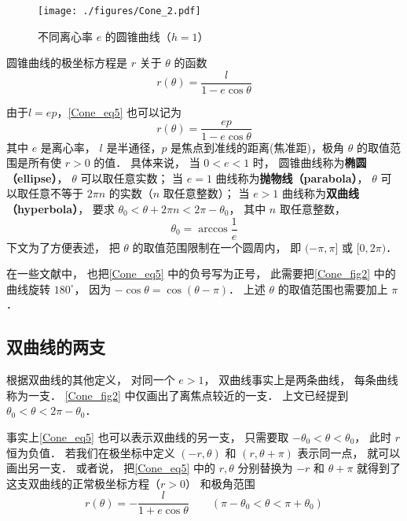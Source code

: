 

\begin{figure}[ht]
\centering
\texttt{[image: ./figures/Cone\_2.pdf]}
\caption{不同离心率 $e$ 的圆锥曲线（$h = 1$）} \label{Cone_fig2}
\end{figure}

圆锥曲线的极坐标方程是 $r$ 关于 $\theta$ 的函数
\begin{equation}\label{Cone_eq5}
r(\theta)  = \frac{l}{1 - e\cos \theta }
\end{equation}

由于$l=ep$，\autoref{Cone_eq5} 也可以记为
\begin{equation}\label{Cone_eq3}
r(\theta) = \frac{ep}{1 - e\cos \theta }
\end{equation}
其中 $e$ 是离心率， $l$ 是半通径，$p$ 是焦点到准线的距离(焦准距)，极角 $\theta$ 的取值范围是所有使 $r>0$ 的值． 具体来说， 当 $0 < e < 1$ 时， 圆锥曲线称为\textbf{椭圆（ellipse）}， $\theta$ 可以取任意实数； 当 $e = 1$ 曲线称为\textbf{抛物线（parabola）}， $\theta$ 可以取任意不等于 $2\pi n$ 的实数（$n$ 取任意整数）； 当 $e > 1$ 曲线称为\textbf{双曲线（hyperbola）}， 要求 $\theta_0< \theta + 2\pi n < 2\pi-\theta_0$， 其中 $n$ 取任意整数，
\begin{equation}
\theta_0 = \arccos\frac{1}{e}
\end{equation}
下文为了方便表述， 把 $\theta$ 的取值范围限制在一个圆周内， 即 $(-\pi,\pi]$ 或 $[0, 2\pi)$．

在一些文献中， 也把\autoref{Cone_eq5} 中的负号写为正号， 此需要把\autoref{Cone_fig2} 中的曲线旋转 $180^\circ$， 因为 $-\cos\theta = \cos(\theta - \pi)$． 上述 $\theta$ 的取值范围也需要加上 $\pi$．

\subsection{双曲线的两支}
根据双曲线的其他定义， 对同一个 $e>1$， 双曲线事实上是两条曲线， 每条曲线称为一支． \autoref{Cone_fig2} 中仅画出了离焦点较近的一支． 上文已经提到 $\theta_0< \theta < 2\pi-\theta_0$．

事实上\autoref{Cone_eq5} 也可以表示双曲线的另一支， 只需要取 $-\theta_0< \theta < \theta_0$， 此时 $r$ 恒为负值． 若我们在极坐标中定义 $(-r, \theta)$ 和 $(r, \theta + \pi)$ 表示同一点， 就可以画出另一支． 或者说， 把\autoref{Cone_eq5} 中的  $r,\theta$ 分别替换为 $-r$ 和 $\theta+\pi$ 就得到了这支双曲线的正常极坐标方程（$r > 0$） 和极角范围
\begin{equation}\label{Cone_eq6}
r(\theta) = -\frac{l}{1 + e\cos\theta} \qquad (\pi - \theta_0<\theta < \pi + \theta_0)
\end{equation}


